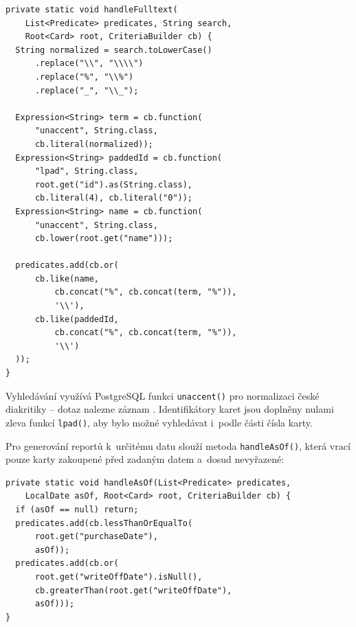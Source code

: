 \begin{listing}[H]
\caption{Fulltextové vyhledávání s~podporou české diakritiky}\label{lst:fulltext}
\begin{verbatim}
private static void handleFulltext(
    List<Predicate> predicates, String search,
    Root<Card> root, CriteriaBuilder cb) {
  String normalized = search.toLowerCase()
      .replace("\\", "\\\\")
      .replace("%", "\\%")
      .replace("_", "\\_");

  Expression<String> term = cb.function(
      "unaccent", String.class,
      cb.literal(normalized));
  Expression<String> paddedId = cb.function(
      "lpad", String.class,
      root.get("id").as(String.class),
      cb.literal(4), cb.literal("0"));
  Expression<String> name = cb.function(
      "unaccent", String.class,
      cb.lower(root.get("name")));

  predicates.add(cb.or(
      cb.like(name,
          cb.concat("%", cb.concat(term, "%")),
          '\\'),
      cb.like(paddedId,
          cb.concat("%", cb.concat(term, "%")),
          '\\')
  ));
}
\end{verbatim}
\end{listing}

Vyhledávání využívá PostgreSQL funkci \texttt{unaccent()} pro normalizaci české diakritiky -- dotaz  nalezne záznam . Identifikátory karet jsou doplněny nulami zleva funkcí \texttt{lpad()}, aby bylo možné vyhledávat i~podle části čísla karty.

Pro generování reportů k~určitému datu slouží metoda \texttt{handleAsOf()}, která vrací pouze karty zakoupené před zadaným datem a~dosud nevyřazené:

\begin{listing}[H]
\caption{Filtr pro point-in-time reporty}\label{lst:asof}
\begin{verbatim}
private static void handleAsOf(List<Predicate> predicates,
    LocalDate asOf, Root<Card> root, CriteriaBuilder cb) {
  if (asOf == null) return;
  predicates.add(cb.lessThanOrEqualTo(
      root.get("purchaseDate"),
      asOf));
  predicates.add(cb.or(
      root.get("writeOffDate").isNull(),
      cb.greaterThan(root.get("writeOffDate"),
      asOf)));
}
\end{verbatim}
\end{listing}

